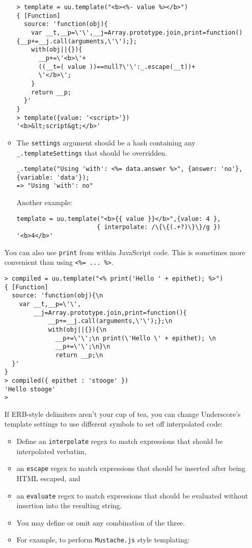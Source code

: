 \begin{itemize}
\begin{itemize}
\begin{verbatim}
> template = uu.template("<b><%- value %></b>")
{ [Function]
  source: 'function(obj){
    var __t,__p=\'\',__j=Array.prototype.join,print=function(){__p+=__j.call(arguments,\'\');};
    with(obj||{}){
      __p+=\'<b>\'+
      ((__t=( value ))==null?\'\':_.escape(__t))+
      \'</b>\';
    }
    return __p;
  }' 
}
> template({value: '<script>'})
'<b>&lt;script&gt;</b>'
\end{verbatim}

\item
The \verb|settings| argument should be a hash containing
any \verb|_.templateSettings| that should be overridden.
\begin{verbatim}
_.template("Using 'with': <%= data.answer %>", {answer: 'no'}, {variable: 'data'});
=> "Using 'with': no"
\end{verbatim}
Another example:
\begin{verbatim}
template = uu.template("<b>{{ value }}</b>",{value: 4 },
                      { interpolate: /\{\{(.+?)\}\}/g })
'<b>4</b>'
\end{verbatim}
\end{itemize}

You can also use \verb|print| from within JavaScript code. This is sometimes
more convenient than using \verb|<%= ... %>|.

\begin{verbatim}
> compiled = uu.template("<% print('Hello ' + epithet); %>")
{ [Function]
  source: 'function(obj){\n
    var __t,__p=\'\',
        __j=Array.prototype.join,print=function(){
            __p+=__j.call(arguments,\'\');};\n
            with(obj||{}){\n
              __p+=\'\';\n print(\'Hello \' + epithet); \n
              __p+=\'\';\n}\n
              return __p;\n
  }' 
}
> compiled({ epithet : 'stooge' })
'Hello stooge'
> 
\end{verbatim}

If ERB-style delimiters aren't your cup of tea, you can change
Underscore's template settings to use different symbols to set off
interpolated code: 

\begin{itemize}
\item
Define an \verb|interpolate| regex to match expressions that
should be interpolated verbatim, 
\item
an \verb|escape| regex to match expressions
that should be inserted after being HTML escaped, and 
\item
an \verb|evaluate| regex
to match expressions that should be evaluated without insertion into
the resulting string. 
\item
You may define or omit any combination of the
three. 
\item
For example, to perform \verb|Mustache.js| style templating:


\end{itemize}
\end{itemize}
